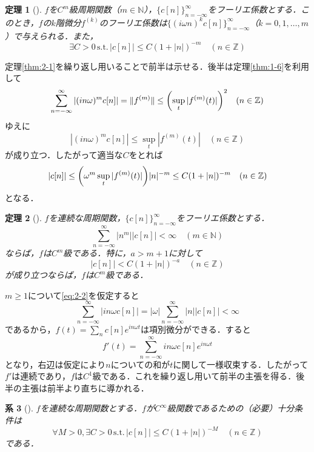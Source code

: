 \documentclass[dvipdfmx,a4j,10pt]{jsarticle}
\makeatletter
\theoremstyle{mystyle1}
\newtheorem{theorem}{定理}[section]
\newtheorem{corollary}[theorem]{系}
\theoremstyle{mystyle3}
\theoremstyle{mystyle4}
\theoremstyle{mystyle6}
\theoremstyle{mystyle2}
\theoremstyle{mystyle5}
\renewenvironment{proof}[1][\proofname]{\par
  \pushQED{\qed}%
  \normalfont
  \topsep6\p@\@plus6\p@ \trivlist
  \item[\hskip\labelsep{\bfseries\sffamily #1}]\ignorespaces
}{%
  \popQED\endtrivlist\@endpefalse
}
\renewcommand\proofname{証明}
\newenvironment{cor}[1][]
{\begin{tcolorbox}[
    enhanced,
    boxrule=0pt,
    arc=0mm,
    frame hidden,
    borderline west={2pt}{-4pt}{blue!50!black},
    breakable = true
    ]
    \begin{corollary}[#1]
}
{\end{corollary}\end{tcolorbox}}
\newenvironment{thm}[1][]
{\begin{tcolorbox}[
    enhanced,
    boxrule=0pt,
    arc=0mm,
    frame hidden,
    borderline west={2pt}{-4pt}{red},
    breakable = true
    ]
    \begin{theorem}[#1]
}
{\end{theorem}\end{tcolorbox}}
\makeatother
\begin{document}
\begin{thm}\label{thm:2-2}
	$f$を$C^m$級周期関数（$m\in\mathbb{N}$），$\{c[n]\}_{n=-\infty}^\infty$をフーリエ係数とする．このとき，$f$の$k$階微分$f^{(k)}$のフーリエ係数は$\{(i\omega n)^k c[n]\}_{n=-\infty}^\infty$（$k=0,1,\ldots,m$）で与えられる．また，
	\begin{equation}\label{eq:2-1}
		\exists C>0\,\textrm{s.t.}\,|c[n]|\leq C(1+|n|)^{-m}\quad (n\in\mathbb{Z})
	\end{equation}
\end{thm}

\begin{proof}
	定理\ref{thm:2-1}を繰り返し用いることで前半は示せる．後半は定理\ref{thm:1-6}を利用して
	\[
		\sum_{n=-\infty}^\infty |(in\omega)^m c[n]|=\|f^{(m)}\|\leq\mleft(\sup_t|f^{(m)}(t)|\mright)^2\quad(n\in\mathbb{Z})
	\]
	ゆえに
	\[
		|(in\omega)^m c[n]|\leq\sup_t|f^{(m)}(t)|\quad(n\in\mathbb{Z})
	\]
	が成り立つ．したがって適当な$C$をとれば
	\[
		|c[n]|\leq\mleft(\omega^m\sup_t|f^{(m)}(t)|\mright)|n|^{-m}\leq C(1+|n|)^{-m}\quad(n\in\mathbb{Z})
	\]
	となる．
\end{proof}

\begin{thm}\label{thm:2-3}
	$f$を連続な周期関数，$\{c[n]\}_{n=-\infty}^\infty$をフーリエ係数とする．
	\begin{equation}\label{eq:2-2}
		\sum_{n=-\infty}^\infty |n^m||c[n]|<\infty\quad(m\in\mathbb{N})
	\end{equation}
	ならば，$f$は$C^m$級である．特に，$a>m+1$に対して
	\[
		|c[n]|<C(1+|n|)^{-a}\quad (n\in\mathbb{Z})
	\]
	が成り立つならば，$f$は$C^m$級である．
\end{thm}

\begin{proof}
	$m\geq 1$について\eqref{eq:2-2}を仮定すると
	\[
		\sum_{n=-\infty}^\infty |in\omega c[n]|=|\omega|\sum_{n=-\infty}^\infty |n||c[n]|<\infty
	\]
	であるから，$f(t)=\sum_n c[n]e^{in\omega t}$は項別微分ができる．すると
	\[
		f'(t)=\sum_{n=-\infty}^\infty in\omega c[n]e^{in\omega t}
	\]
	となり，右辺は仮定により$n$についての和が$t$に関して一様収束する．したがって$f'$は連続であり，$f$は$C^1$級である．これを繰り返し用いて前半の主張を得る．後半の主張は前半より直ちに導かれる．
\end{proof}

\begin{cor}\label{cor:2-4}
	$f$を連続な周期関数とする．$f$が$C^\infty$級関数であるための（必要）十分条件は
	\[
		\forall M>0,\exists C>0\,\textrm{s.t.}\,|c[n]|\leq C(1+|n|)^{-M}\quad(n\in\mathbb{Z})
	\]
	である．
\end{cor}
\end{document}
